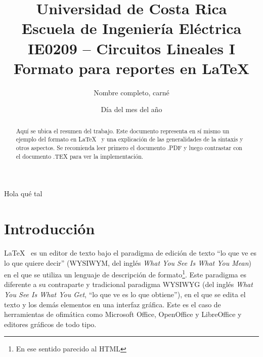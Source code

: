 \documentclass[12pt,letterpaper]{article}
\begin{document}

\author{Nombre completo, carné}

\title{%
{\normalsize{\sc Universidad de Costa Rica}} \\[-2mm] {\normalsize Escuela de Ingeniería Eléctrica} \\[-2mm] {\normalsize IE0209 -- Circuitos Lineales I} \\[5mm]
Formato para reportes en \LaTeX
}

\date{Día del mes del año} 

\maketitle							%


\begin{abstract}
Aquí se ubica el resumen del trabajo. Este documento representa en sí mismo un ejemplo del formato en \LaTeX~ y una explicación de las generalidades de la sintaxis y otros aspectos. Se recomienda leer primero el documento .PDF y luego contrastar con el documento .TEX para ver la implementación.
\end{abstract}


\tableofcontents
\listoffigures
\listoftables

Hola qué tal

\section{Introducción}

\LaTeX~ es un editor de texto bajo el paradigma de edición de texto ``lo que ve es lo que quiere decir'' (WYSIWYM, del inglés \emph{What You See Is What You Mean}) en el que se utiliza un lenguaje de descripción de formato\footnote{En ese sentido parecido al HTML}. Este paradigma es diferente a su contraparte y tradicional paradigma WYSIWYG (del inglés \emph{What You See Is What You Get}, ``lo que ve es lo que obtiene''), en el que se edita el texto y los demás elementos en una interfaz gráfica. Este es el caso de herramientas de ofimática como Microsoft Office, OpenOffice y LibreOffice y editores gráficos de todo tipo.
\end{document}
